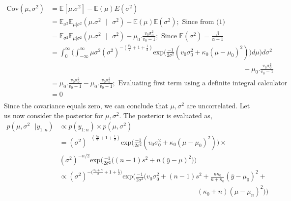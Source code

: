 \documentclass[11pt]{article}
\begin{document}
\begin{equation}
  \nonumber
  \begin{aligned}
    \text{Cov}(\mu, \sigma^{2}) & = \mathbb{E}[\mu.\sigma^{2}] - \mathbb{E}(\mu)E(\sigma^{2})\\
    & = \mathbb{E}_{\sigma^{2}}\mathbb{E}_{\mu | \sigma^{2}}(\mu.\sigma^{2}\text{ }|\text{ } \sigma^{2}) - \mathbb{E}(\mu)\mathbb{E}(\sigma^{2}); \text{ Since from (1)}\\
    & = \mathbb{E}_{\sigma^{2}}\mathbb{E}_{\mu | \sigma^{2}}(\mu.\sigma^{2}\text{ }|\text{ } \sigma^{2}) - \mu_{0}.\frac{v_{0} \sigma_{0}^{2}}{v_{0} - 1}; \text{ Since  } \mathbb{E}(\sigma^{2}) = \frac{\beta}{\alpha - 1}\\
    & = \int_{0}^{\infty}\bigg(\int_{-\infty}^{\infty} \mu \sigma^{2} (\sigma^{2})^{-(\frac{v_{0}}{2} + 1 + \frac{1}{2})}\text{exp}\bigg(\frac{-1}{2\sigma^2}(v_{0}\sigma_{0}^{2} + \kappa_{0}(\mu - \mu_{0})^2)\bigg)  d\mu\bigg) d\sigma^{2}\\
    & \hspace{28em} - \mu_{0}.\frac{v_{0} \sigma_{0}^{2}}{v_{0} - 1}\\
    & = \mu_{0}.\frac{v_{0} \sigma_{0}^{2}}{v_{0} - 1} - \mu_{0}.\frac{v_{0} \sigma_{0}^{2}}{v_{0} - 1}; \text{ Evaluating first term using a definite integral calculator}\\
    & = 0\\
  \end{aligned}
\end{equation}
Since the covariance equals zero, we can conclude that $\mu, \sigma^2$ are uncorrelated. Let us now consider the posterior for $\mu, \sigma^2$. The posterior is evaluated as,
\begin{equation}
  \nonumber
  \begin{aligned}
    p(\mu, \sigma^2 \text{ } | { } y_{1:n}) & \propto p(y_{1:n}) \times p(\mu, \sigma^2)\\
    & = (\sigma^{2})^{-(\frac{v_{0}}{2} + 1 + \frac{1}{2})}\text{exp}\bigg(\frac{-1}{2\sigma^2}(v_{0}\sigma_{0}^{2} + \kappa_{0}(\mu - \mu_{0})^2)\bigg) \times \\ & (\sigma^2)^{-n/2}\text{exp}\bigg(\frac{-1}{2 \sigma^2}\big((n-1)s^2 + n(\bar{y} - \mu)^2\big)\bigg)\\
    & \propto (\sigma^{2})^{-\big(\frac{v_{0} + n}{2} + 1 + \frac{1}{2}\big)}\text{exp}\bigg(\frac{-1}{2 \sigma^{2}}\big(v_{0}\sigma_{0}^{2} + (n-1)s^2 + \frac{n \kappa_{0}}{n + \kappa_{0}}(\bar{y} - \mu_{0})^{2} + \\
    & \hspace{20em} (\kappa_{0} + n)(\mu - \mu_{n})^{2}\big)\bigg)
  \end{aligned}
\end{equation}
\end{document}
